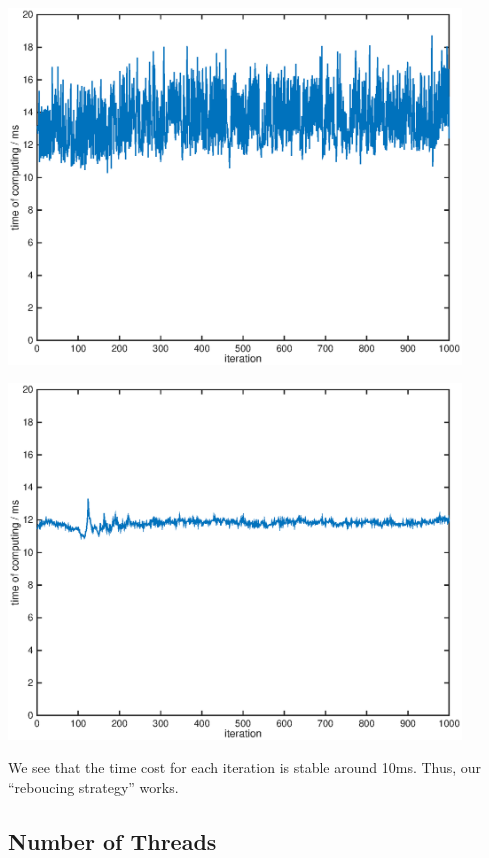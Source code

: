 \documentclass[11pt, a4paper]{article}
\makeatletter
\newcommand\fcaption{\def\@captype{figure}\caption}
\makeatother
\begin{document}
\begin{center}
    \includegraphics[width=12cm]{time_pthread}
    \fcaption{Time cost per each iteration (pthread)}\label{time_p}
\end{center}

\begin{center}
    \includegraphics[width=12cm]{time_cuda}
    \fcaption{Time cost per each iteration (cuda)}\label{time_c}
\end{center}

We see that the time cost for each iteration is stable around 10ms. Thus, our ``reboucing strategy'' works.

\subsection{Number of Threads}
\end{document}
